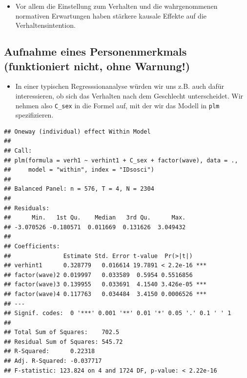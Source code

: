 \documentclass[
]{book}
\newenvironment{Shaded}{\begin{snugshade}}{\end{snugshade}}
\newcommand{\DataTypeTok}[1]{\textcolor[rgb]{0.13,0.29,0.53}{#1}}
\newcommand{\KeywordTok}[1]{\textcolor[rgb]{0.13,0.29,0.53}{\textbf{#1}}}
\newcommand{\NormalTok}[1]{#1}
\newcommand{\OperatorTok}[1]{\textcolor[rgb]{0.81,0.36,0.00}{\textbf{#1}}}
\newcommand{\StringTok}[1]{\textcolor[rgb]{0.31,0.60,0.02}{#1}}
\providecommand{\tightlist}{%
  \setlength{\itemsep}{0pt}\setlength{\parskip}{0pt}}
\begin{document}
\begin{itemize}
\tightlist
\item
  Vor allem die Einstellung zum Verhalten und die wahrgenommenen normativen Erwartungen haben stärkere kausale Effekte auf die Verhaltensintention.
\end{itemize}

\hypertarget{aufnahme-eines-personenmerkmals-funktioniert-nicht-ohne-warnung}{%
\subsection*{Aufnahme eines Personenmerkmals (funktioniert nicht, ohne Warnung!)}\label{aufnahme-eines-personenmerkmals-funktioniert-nicht-ohne-warnung}}

\begin{itemize}
\tightlist
\item
  In einer typischen Regresssionanalyse würden wir uns z.B. auch dafür interessieren, ob sich das Verhalten nach dem Geschlecht unterscheidet. Wir nehmen also \texttt{C\_sex} in die Formel auf, mit der wir das Modell in \texttt{plm} spezifizieren.
\end{itemize}

\begin{Shaded}
\end{Shaded}

\begin{verbatim}
## Oneway (individual) effect Within Model
## 
## Call:
## plm(formula = verh1 ~ verhint1 + C_sex + factor(wave), data = ., 
##     model = "within", index = "IDsosci")
## 
## Balanced Panel: n = 576, T = 4, N = 2304
## 
## Residuals:
##      Min.   1st Qu.    Median   3rd Qu.      Max. 
## -3.070526 -0.180571  0.011669  0.131626  3.049432 
## 
## Coefficients:
##               Estimate Std. Error t-value  Pr(>|t|)    
## verhint1      0.328779   0.016614 19.7891 < 2.2e-16 ***
## factor(wave)2 0.019997   0.033589  0.5954 0.5516856    
## factor(wave)3 0.139955   0.033691  4.1540 3.426e-05 ***
## factor(wave)4 0.117763   0.034484  3.4150 0.0006526 ***
## ---
## Signif. codes:  0 '***' 0.001 '**' 0.01 '*' 0.05 '.' 0.1 ' ' 1
## 
## Total Sum of Squares:    702.5
## Residual Sum of Squares: 545.72
## R-Squared:      0.22318
## Adj. R-Squared: -0.037717
## F-statistic: 123.824 on 4 and 1724 DF, p-value: < 2.22e-16
\end{verbatim}
\end{document}
